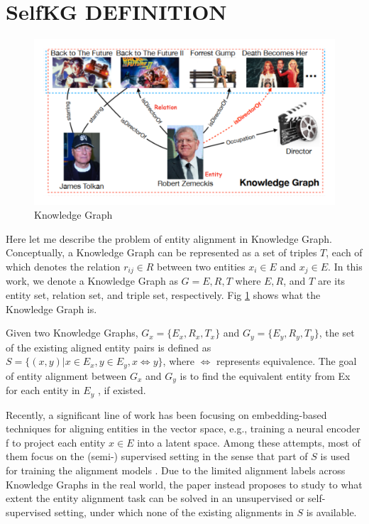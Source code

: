 \documentclass[sigconf]{acmart}
\begin{document}
{\section{SelfKG DEFINITION}
\begin{figure}[h]
    \centering
    \includegraphics[width=1\linewidth]{figure/KG.png}
    \caption{Knowledge Graph\cite{10.1145/3308558.3313705}}
    \label{kg}
\end{figure}
Here let me describe the problem of entity alignment in Knowledge Graph. Conceptually, a Knowledge Graph can be represented as a set of triples $T$, each of which denotes the relation $r_{ij} \in R$ between two entities $x_i \in E$ and $x_j \in E$. In this work, we denote a Knowledge Graph as $G = {E, R, T}$ where $E, R$, and $T$ are its entity set, relation set, and triple set, respectively. Fig \ref{kg} shows what the Knowledge Graph is.

Given two Knowledge Graphs, $G_x = \{E_x , R_x , T_x\}$ and $G_y = \{E_y , R_y , T_y\}$, the set of the existing aligned entity pairs is defined as $S = \{(x, y)|x \in E_x , y \in E_y , x \Leftrightarrow  y\}$, where $\Leftrightarrow$ represents equivalence. The goal of entity alignment between $G_x$ and $G_y$ is to find the equivalent entity from Ex for each entity in $E_y$ , if existed.

Recently, a significant line of work has been focusing on embedding-based techniques for aligning entities in the vector space, e.g., training a neural encoder f to project each entity $x \in E$ into a latent space. Among these attempts, most of them focus on the (semi-) supervised setting in the sense that part of $S$ is used for training the alignment models \cite{chen2016multilingual,tang2020bert,wang2018cross,wu2019relation}. Due to the limited alignment labels across Knowledge Graphs in the real world, the paper instead proposes to study to what extent the entity alignment task can be solved in an unsupervised or self-supervised setting, under which none of the existing alignments in $S$ is available.
}
\end{document}
